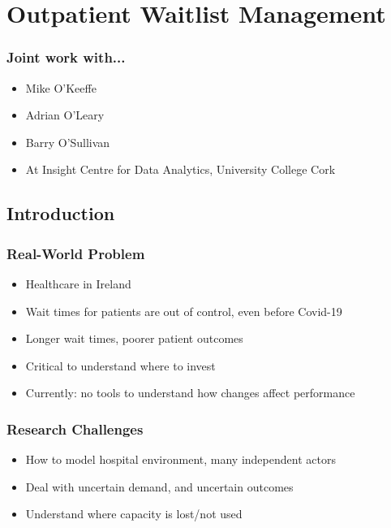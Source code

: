 \section{Outpatient Waitlist Management}


\begin{frame}
\frametitle{Joint work with...}
\begin{itemize}
\item Mike O'Keeffe
\item Adrian O'Leary
\item Barry O'Sullivan
\item At Insight Centre for Data Analytics, University College Cork
\end{itemize}
\end{frame}

\subsection{Introduction}

\begin{frame}
\frametitle{Real-World Problem}
\begin{itemize}
\item Healthcare in Ireland
\item Wait times for patients are out of control, even before Covid-19
\item Longer wait times, poorer patient outcomes
\item Critical to understand where to invest
\item Currently: no tools to understand how changes affect performance
\end{itemize}
\end{frame}

\begin{frame}
\frametitle{Research Challenges}
\begin{itemize}
\item How to model hospital environment, many independent actors
\item Deal with uncertain demand, and uncertain outcomes
\item Understand where capacity is lost/not used
\end{itemize}
\end{frame}



